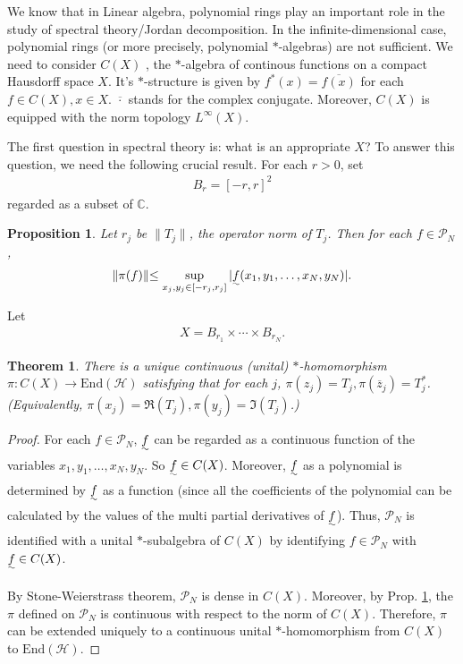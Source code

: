 \documentclass[12pt,b5paper,notitlepage]{article}
\theoremstyle{definition}
\theoremstyle{plain}
\newtheorem{thm}[df]{Theorem}
\newtheorem{pp}[df]{Proposition}
\newcommand{\mc}{\mathcal}
\newcommand{\ovl}{\overline}
\newcommand{\End}{\mathrm{End}} %
\newcommand{\Cbb}{\mathbb C}
\numberwithin{equation}{section}
\begin{document}
We know that in Linear algebra, polynomial rings play an important role in the study of spectral theory/Jordan decomposition. In the infinite-dimensional case, polynomial rings (or more precisely, polynomial $*$-algebras) are not sufficient. We need to consider $C(X)$ , the $*$-algebra of continous functions on a compact Hausdorff space $X$. It's $*$-structure is given by $f^*(x)=\ovl{f(x)}$ for each $f\in C(X),x\in X$. $\ovl{\cdot}$ stands for the complex conjugate. Moreover, $C(X)$ is equipped with the norm topology $L^\infty(X)$.


The first question in spectral theory is: what is an appropriate $X$? To answer this question, we need the following crucial result. For each $r>0$, set 
\begin{align}
B_r=[-r,r]^2	
\end{align}
regarded as a subset of $\Cbb$.

\begin{pp}\label{lb1}
Let $r_j$ be $\lVert T_j\lVert$, the operator norm of $T_j$. Then for each $f\in\mc P_N$, 
\begin{align}\label{eq25}
\lVert \pi(f)\lVert\leq \sup_{x_j,y_j\in[-r_j,r_j]}| \uwave f(x_1,y_1,\dots,x_N,y_N)|.	
\end{align}
\end{pp}


Let
\begin{align*}
X=B_{r_1}\times\cdots \times B_{r_N}.
\end{align*}

\begin{thm}\label{lb17}
There is a unique  continuous (unital) $*$-homomorphism $\pi:C(X)\rightarrow\End(\mc H)$ satisfying that for each $j$, $\pi(z_j)=T_j,\pi(\ovl z_j)=T_j^*$. (Equivalently, $\pi(x_j)=\Re(T_j),\pi(y_j)=\Im (T_j)$.)
\end{thm}


\begin{proof}
For each  $f\in\mc P_N$, $\uwave f$ can be regarded as a continuous function of the variables $x_1,y_1,\dots,x_N,y_N$. So $\uwave f\in C(X)$. Moreover, $\uwave f$ as a polynomial is determined by $\uwave f$ as a function (since all the coefficients of the polynomial can be calculated by the values of the multi partial derivatives of $\uwave f$). Thus, $\mc P_N$ is identified with a unital $*$-subalgebra of $C(X)$ by identifying $f\in\mc P_N$ with $\uwave f\in C(X)$.

By Stone-Weierstrass theorem, $\mc P_N$ is dense in $C(X)$. Moreover, by Prop. \ref{lb1}, the $\pi$ defined on $\mc P_N$ is continuous with respect to the norm of $C(X)$. Therefore, $\pi$ can be extended uniquely to a continuous unital $*$-homomorphism from $C(X)$ to $\End(\mc H)$.
\end{proof}
\end{document}
